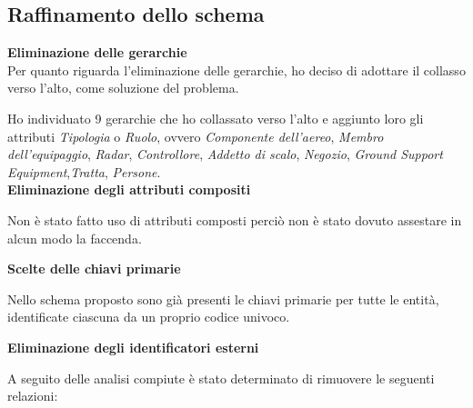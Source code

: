 \newpage

\subsection{Raffinamento dello schema}

\textbf{Eliminazione delle gerarchie}\\
\textsf{\small Per quanto riguarda l'eliminazione delle gerarchie, ho deciso di adottare il collasso verso l'alto, come soluzione del problema.}\break 



\textsf{\small Ho individuato 9 gerarchie che ho collassato verso l'alto e aggiunto loro gli attributi \emph{Tipologia} o \emph{Ruolo}, ovvero \emph{Componente dell'aereo}, \emph{Membro dell'equipaggio}, \emph{Radar}, \emph{Controllore}, \emph{Addetto di scalo}, \emph{Negozio}, \emph{Ground Support Equipment},\emph{Tratta}, \emph{Persone}.}\\

\textbf{Eliminazione degli attributi compositi}

\textsf{\small Non è stato fatto uso di attributi composti perciò non è stato dovuto assestare in alcun modo la faccenda.}\break %

\textbf{Scelte delle chiavi primarie}

\textsf{\small Nello schema proposto sono già presenti le chiavi primarie per tutte le entità, identificate ciascuna da un proprio codice univoco.}\break

\textbf{Eliminazione degli identificatori esterni}

\textsf{\small A seguito delle analisi compiute è stato determinato di rimuovere le seguenti relazioni:}\\ %


